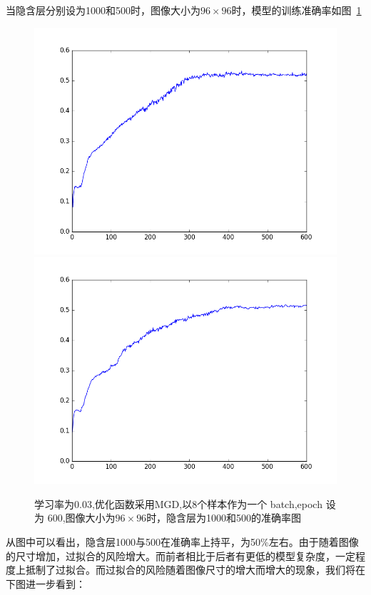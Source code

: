 当隐含层分别设为1000和500时，图像大小为$96\times 96$时，模型的训练准确率如图~\ref{fig:bp7}
\begin{figure}[htb]
\centering
\includegraphics[scale=0.35]{../figures/Log/BP_new2/BP_new2_acc.png}
\includegraphics[scale=0.35]{../figures/Log/BP_new5/BP_new5_acc.png} 
\caption{学习率为0.03,优化函数采用MGD,以8个样本作为一个 batch,epoch 设为 600,图像大小为$96\times 96$时，隐含层为1000和500的准确率图}
\label{fig:bp7}
\end{figure}
从图中可以看出，隐含层1000与500在准确率上持平，为50\%左右。由于随着图像的尺寸增加，过拟合的风险增大。而前者相比于后者有更低的模型复杂度，一定程度上抵制了过拟合。而过拟合的风险随着图像尺寸的增大而增大的现象，我们将在下图进一步看到：

